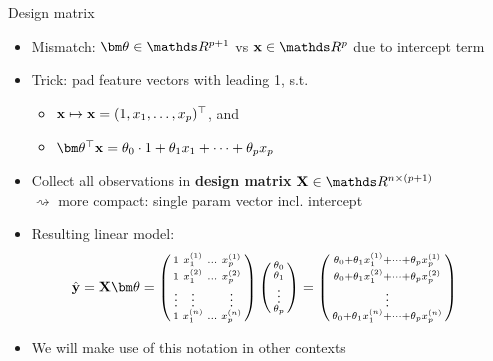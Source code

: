 \documentclass[11pt,compress,t,notes=noshow, xcolor=table]{beamer}
\begin{document}
\begin{vbframe}{Design matrix}

\begin{itemize}
    \item Mismatch: $\thetav \in \R^{p + 1}$ vs $\xv \in \R^p$ due to intercept  
    term
    \item Trick: pad feature vectors with leading 1, s.t. 
    \begin{itemize}
        \item $\mathbf{x} \mapsto \mathbf{x} = (1, x_1, \dots, x_p)^\top$, and 
        \item $\thx = \theta_0 \cdot 1 + \theta_1 x_1 + \dots + \theta_p x_p$
    \end{itemize}
    \item Collect all observations in \textbf{design matrix} 
    $\Xmat \in \R^{n \times (p + 1)}$ \\
    $\rightsquigarrow$ more compact: single param vector incl. intercept
    \item Resulting linear model:
    \begin{align*}
    \hat \yv = \Xmat \thetav = 
        \left(
        \begin{smallmatrix}
            1 & x^{(1)}_1 & \ldots & x^{(1)}_p \\
            1 & x^{(2)}_1 & \ldots & x^{(2)}_p \\
            \vdots & \vdots & & \vdots \\
            1 & x^{(n)}_1 & \ldots & x^{(n)}_p \\
        \end{smallmatrix}
        \right)
        \left(
        \begin{smallmatrix}
            \theta_0 \\ \theta_1 \\ \vdots \\ \theta_p
        \end{smallmatrix}
        \right)
        &=
        \left(
        \begin{smallmatrix}
            \theta_0 + \theta_1 x_1^{(1)} + \dots + \theta_p x_p^{(1)} \\
            \theta_0 + \theta_1 x_1^{(2)} + \dots + \theta_p x_p^{(2)} \\
            \vdots \\
            \theta_0 + \theta_1 x_1^{(n)} + \dots + \theta_p x_p^{(n)} \\
        \end{smallmatrix}
        \right)
    \end{align*}
    \item We will make use of this notation in other contexts
\end{itemize}

\end{vbframe}
\end{document}
